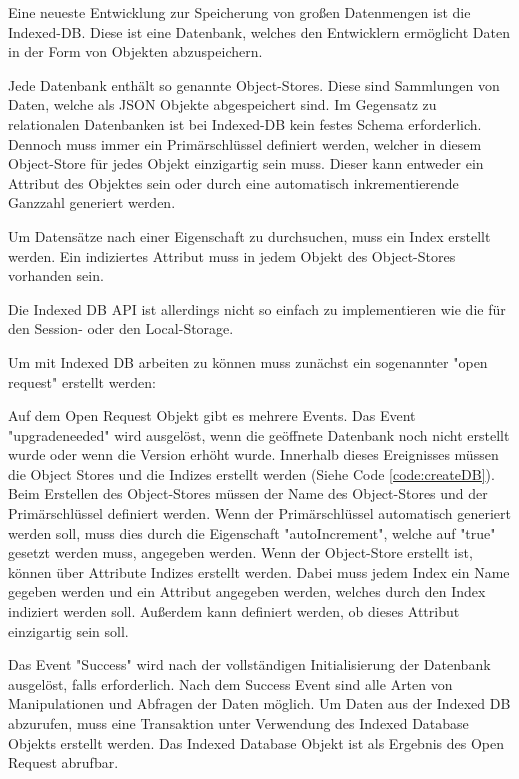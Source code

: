 
Eine neueste Entwicklung zur Speicherung von großen Datenmengen ist die Indexed-DB. 
Diese ist eine Datenbank, welches den Entwicklern ermöglicht Daten in der Form von Objekten abzuspeichern.

Jede Datenbank enthält so genannte Object-Stores. Diese sind Sammlungen von Daten, welche als JSON Objekte abgespeichert sind. 
Im Gegensatz zu relationalen Datenbanken ist bei Indexed-DB kein festes Schema erforderlich. 
Dennoch muss immer ein Primärschlüssel definiert werden, welcher in diesem Object-Store für jedes Objekt einzigartig sein muss.
Dieser kann entweder ein Attribut des Objektes sein oder durch eine automatisch inkrementierende Ganzzahl generiert werden. 

Um Datensätze nach einer Eigenschaft zu durchsuchen, muss ein Index erstellt werden. Ein indiziertes Attribut muss in jedem Objekt des Object-Stores vorhanden sein.

Die Indexed DB API ist allerdings nicht so einfach zu implementieren wie die für den Session- oder den Local-Storage. 

Um mit Indexed DB arbeiten zu können muss zunächst ein sogenannter "open request" erstellt werden:


Auf dem Open Request Objekt gibt es mehrere Events. 
Das Event "upgradeneeded" wird ausgelöst, wenn die geöffnete Datenbank noch nicht erstellt wurde oder wenn die Version erhöht wurde. 
Innerhalb dieses Ereignisses müssen die Object Stores und die Indizes erstellt werden (Siehe Code \ref{code:createDB}). 
Beim Erstellen des Object-Stores müssen der Name des Object-Stores und der Primärschlüssel definiert werden. Wenn der Primärschlüssel automatisch generiert werden soll, muss dies durch die Eigenschaft "autoIncrement", welche auf "true" gesetzt werden muss, angegeben werden.
Wenn der Object-Store erstellt ist, können über Attribute Indizes erstellt werden. Dabei muss jedem Index ein Name gegeben werden und ein Attribut angegeben werden, welches durch den Index indiziert werden soll. Außerdem kann definiert werden, ob dieses Attribut einzigartig sein soll.


Das Event "Success" wird nach der vollständigen Initialisierung der Datenbank ausgelöst, falls erforderlich. Nach dem Success Event sind alle Arten von Manipulationen und Abfragen der Daten möglich. Um Daten aus der Indexed DB abzurufen, muss eine Transaktion unter Verwendung des Indexed Database Objekts erstellt werden. Das Indexed Database Objekt ist als Ergebnis des Open Request abrufbar.


